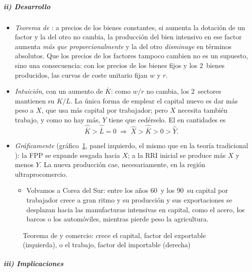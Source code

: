 \documentclass[11pt]{article}
\begin{document}
\subparagraph{ii) Desarrollo}

\begin{itemize}
\item \emph{Teorema de } : a precios de los bienes constantes, si aumenta la dotación de un factor y la del otro no cambia, la producción del bien intensivo en ese factor aumenta \emph{más que proporcionalmente} y la del otro \emph{disminuye} en términos absolutos. Que los precios de los factores tampoco cambien no es un supuesto, sino una consecuencia: con los precios de los bienes fijos y los 2~bienes producidos, las curvas de coste unitario fijan $w$ y $r$.
\item \emph{Intuición}, con un aumento de $\overline K$: como $w/r$ no cambia, los 2~sectores mantienen su $K/L$. La única forma de emplear el capital nuevo es dar más peso a $X$, que usa más capital por trabajador; pero $X$ necesita también trabajo, y como no hay más, $Y$ tiene que cedérselo. El  en cantidades es
  \begin{equation}\label{eq:rybczynski}
  \hat{\overline K}>\hat{\overline L}=0\;\Longrightarrow\;\hat X>\hat{\overline K}>0>\hat Y.
  \end{equation}
\item \emph{Gráficamente} (gráfico~\ref{fig:rybczynski}, panel izquierdo, el mismo que en la teoría tradicional ): la FPP se expande sesgada hacia $X$; a la RRI inicial se produce más $X$ y menos $Y$. La nueva producción cae, necesariamente, en la región ultraprocomercio.
  \begin{itemize}
  \item Volvamos a Corea del Sur: entre los años 60~y los 90~su capital por trabajador crece a gran ritmo\nocite{Young1995} y su producción y sus exportaciones se desplazan hacia las manufacturas intensivas en capital, como el acero, los barcos o los automóviles, mientras pierde peso la agricultura.
  \end{itemize}
\end{itemize}
\begin{figure}[H]
\centering
\caption{Teorema de  y comercio: crece el capital, factor del exportable (izquierda), o el trabajo, factor del importable (derecha)}\label{fig:rybczynski}
\end{figure}

\subparagraph{iii) Implicaciones}
\end{document}
